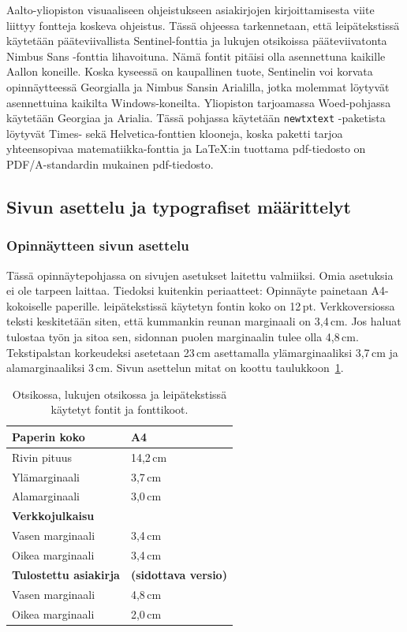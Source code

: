 \documentclass[finnish, 12pt, a4paper, elec, utf8, a-2b, online]{aaltothesis}
\begin{document}
Aalto-yliopiston visuaaliseen ohjeistukseen asiakirjojen kirjoittamisesta 
viite \cite{aaltovisual} liittyy fontteja koskeva ohjeistus. Tässä ohjeessa 
tarkennetaan, että leipätekstissä käytetään pääteviivallista Sentinel-fonttia ja
lukujen otsikoissa pääteviivatonta Nimbus Sans -fonttia lihavoituna. Nämä fontit 
pitäisi olla asennettuna kaikille Aallon koneille. Koska kyseessä on kaupallinen 
tuote, Sentinelin voi korvata opinnäytteessä Georgialla ja Nimbus Sansin 
Arialilla, jotka molemmat löytyvät asennettuina kaikilta Windows-koneilta. 
Yliopiston tarjoamassa Woed-pohjassa käytetään Georgiaa ja Arialia. Tässä 
pohjassa käytetään \verb+newtxtext+ -paketista löytyvät Times- sekä 
Helvetica-fonttien klooneja, koska paketti tarjoa yhteensopivaa 
matematiikka-fonttia ja \LaTeX:in tuottama pdf-tiedosto on PDF/A-standardin 
mukainen pdf-tiedosto.

\subsection*{Sivun asettelu ja typografiset määrittelyt}
\subsubsection*{Opinnäytteen sivun asettelu}

Tässä opinnäytepohjassa on sivujen asetukset laitettu valmiiksi. Omia asetuksia
ei ole tarpeen laittaa. Tiedoksi kuitenkin periaatteet: Opinnäyte painetaan 
A4-kokoiselle paperille. leipätekstissä käytetyn fontin koko on 12\,pt. 
Verkkoversiossa teksti keskitetään siten, että kummankin reunan marginaali on 
3,4\,cm. Jos haluat tulostaa työn ja sitoa sen, sidonnan puolen marginaalin 
tulee olla 4,8\,cm. Tekstipalstan korkeudeksi asetetaan 23\,cm asettamalla 
ylämarginaaliksi 3,7\,cm ja alamarginaaliksi 3\,cm. Sivun asettelun mitat on 
koottu taulukkoon~\ref{liitetau:asemointi}.

\begin{table}[htb]
	\centering
	\caption{Otsikossa, lukujen otsikossa ja leipätekstissä käytetyt fontit ja fonttikoot.}
	\label{liitetau:asemointi}
	\sffamily%
	\begin{tabular}{ll}
		\hline
		Paperin koko & A4\\\hline
		Rivin pituus & 14,2\,cm \\\hline
		Ylämarginaali & 3,7\,cm \\\hline
		Alamarginaali & 3,0\,cm \\\hline
		\textbf{Verkkojulkaisu} & \\\hline
		Vasen marginaali & 3,4\,cm \\\hline
		Oikea marginaali & 3,4\,cm \\\hline
		\textbf{Tulostettu asiakirja} & \textbf{(sidottava versio)} \\\hline
		Vasen marginaali & 4,8\,cm \\\hline
		Oikea marginaali & 2,0\,cm \\\hline
	\end{tabular}
\end{table}
\end{document}
